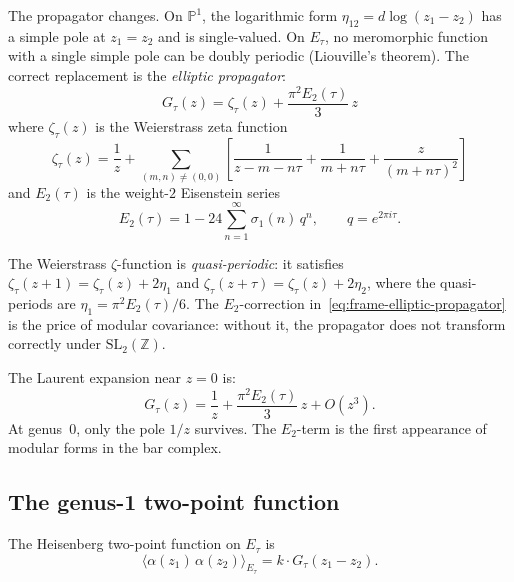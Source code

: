 The propagator changes.  On $\mathbb{P}^1$, the logarithmic form
$\eta_{12} = d\log(z_1 - z_2)$ has a simple pole at $z_1 = z_2$
and is single-valued.  On $E_\tau$, no meromorphic function with
a single simple pole can be doubly periodic (Liouville's theorem).
The correct replacement is the \emph{elliptic propagator}:
\begin{equation}\label{eq:frame-elliptic-propagator}
G_\tau(z) = \zeta_\tau(z) + \frac{\pi^2 E_2(\tau)}{3}\, z
\end{equation}
where $\zeta_\tau(z)$ is the Weierstrass zeta function
\begin{equation}\label{eq:frame-weierstrass-zeta}
\zeta_\tau(z) = \frac{1}{z}
+ \sum_{(m,n) \neq (0,0)}\left[
  \frac{1}{z - m - n\tau}
  + \frac{1}{m + n\tau}
  + \frac{z}{(m+n\tau)^2}
\right]
\end{equation}
and $E_2(\tau)$ is the weight-$2$ Eisenstein series
\begin{equation}\label{eq:frame-E2}
E_2(\tau) = 1 - 24\sum_{n=1}^{\infty} \sigma_1(n)\, q^n,
\qquad q = e^{2\pi i \tau}.
\end{equation}

The Weierstrass $\zeta$-function is \emph{quasi-periodic}: it
satisfies $\zeta_\tau(z + 1) = \zeta_\tau(z) + 2\eta_1$ and
$\zeta_\tau(z + \tau) = \zeta_\tau(z) + 2\eta_2$, where the
quasi-periods are $\eta_1 = \pi^2 E_2(\tau)/6$.  The
$E_2$-correction in~\eqref{eq:frame-elliptic-propagator}
is the price of modular covariance: without it, the propagator
does not transform correctly under $\mathrm{SL}_2(\mathbb{Z})$.

The Laurent expansion near $z = 0$ is:
\begin{equation}\label{eq:frame-green-laurent}
G_\tau(z) = \frac{1}{z}
+ \frac{\pi^2 E_2(\tau)}{3}\, z + O(z^3).
\end{equation}
At genus~$0$, only the pole $1/z$ survives.  The $E_2$-term
is the first appearance of modular forms in the bar complex.

\subsection{The genus-1 two-point function}

The Heisenberg two-point function on $E_\tau$ is
\begin{equation}\label{eq:frame-genus1-2pt}
\langle \alpha(z_1)\, \alpha(z_2) \rangle_{E_\tau}
= k \cdot G_\tau(z_1 - z_2).
\end{equation}

